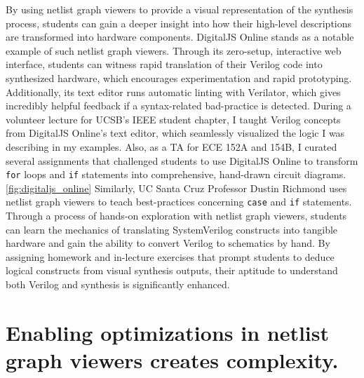 By using netlist graph viewers to provide a visual representation of the synthesis process, students can gain a deeper insight into how their high-level descriptions are transformed into hardware components. DigitalJS Online \cite{DigitalJSOnline} stands as a notable example of such netlist graph viewers. Through its zero-setup, interactive web interface, students can witness rapid translation of their Verilog code into synthesized hardware, which encourages experimentation and rapid prototyping. Additionally, its text editor runs automatic linting with Verilator, which gives incredibly helpful feedback if a syntax-related bad-practice is detected. During a volunteer lecture for UCSB's IEEE student chapter, I taught Verilog concepts from DigitalJS Online's text editor, which seamlessly visualized the logic I was describing in my examples. Also, as a TA for ECE 152A and 154B, I curated several assignments that challenged students to use DigitalJS Online to transform \texttt{for} loops and \texttt{if} statements into comprehensive, hand-drawn circuit diagrams. \autoref{fig:digitaljs_online} Similarly, UC Santa Cruz Professor Dustin Richmond uses netlist graph viewers to teach best-practices concerning \texttt{case} and \texttt{if} statements. \cite{RichmondLatchUp} Through a process of hands-on exploration with netlist graph viewers, students can learn the mechanics of translating SystemVerilog constructs into tangible hardware and gain the ability to convert Verilog to schematics by hand. By assigning homework and in-lecture exercises that prompt students to deduce logical constructs from visual synthesis outputs, their aptitude to understand both Verilog and synthesis is significantly enhanced.

\FloatBarrier

\section{Enabling optimizations in netlist graph viewers creates complexity.}
\label{section:optimizations_in_netlist_graph_viewers}



